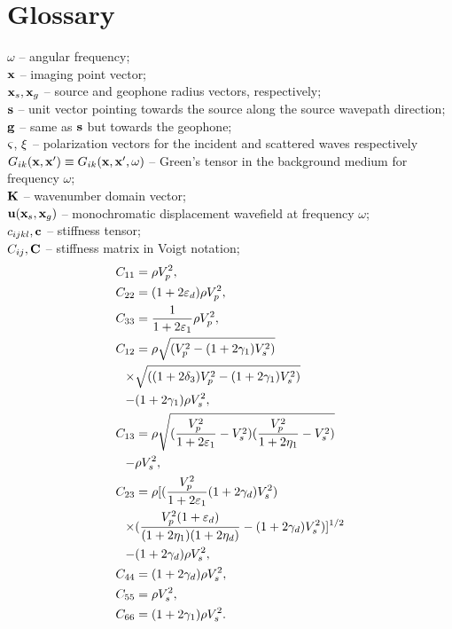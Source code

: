 \section*{Glossary}

$\omega$ -- angular frequency;
\\
$\xv$ -- imaging point vector;
\\
$\xv_s, \xv_g$ -- source and geophone radius vectors, respectively;
\\
$\sv$ -- unit vector pointing towards the source along the source wavepath direction;
\\
$\gv$ -- same as $\sv$ but towards the geophone;
\\
$\sp$, $\gp$ -- polarization vectors for the incident and scattered waves respectively
\\
$G_{ik}(\xv,\xv') \equiv G_{ik}(\xv,\xv',\omega)$ -- Green's tensor in the background medium for frequency $\omega$;
\\
$\Kv$ -- wavenumber domain vector;
\\
$\uv(\xv_s,\xv_g)$ -- monochromatic displacement wavefield at frequency $\omega$;
\\
$c_{ijkl}, \cv$ -- stiffness tensor;
\\
$C_{ij}, \Cv$ -- stiffness matrix in Voigt notation; 
\\
\begin{align} \label{eq:jw}
C_{11} &=\rho V^2_{p},
\\
C_{22} &=(1+2\eps_d)\rho V^2_{p},
\\
C_{33} &= \frac{1}{1+2\eps_1} \rho V^2_{p},
\\
C_{12} &= \rho \sqrt{( V^2_{p}-(1+2\gamma_1) V^2_{s})}\\
\times&\sqrt{((1+2\delta_3)V^2_{p}-(1+2\gamma_1) V^2_{s})}\\
- & (1+2\gamma_1 )\rho V^2_{s},
\\
C_{13} &= \rho \sqrt{(\frac{V^2_{p}}{1+2\eps_1}-V^2_{s})
	(\frac{V^2_{p}}{1+2\eta_1}-V^2_{s})}
\\
-&\rho V^2_{s},
\\
C_{23} &= \rho [(\frac{V^2_{p}}{1+2\eps_1}(1+2\gamma_d)\v_s^2)
\\
\times & (\frac{V^2_{p}(1+\eps_d)}{(1+2\eta_1)(1+2\eta_d)}-(1+2\gamma_d)V^2_{s})]^{1/2} 
\\
-&(1+2\gamma_d)\rho V^2_{s},
\\
C_{44} &=(1+2\gamma_d)\rho V^2_{s},
\\
C_{55} &=\rho V^2_{s},
\\
C_{66} &=(1+2\gamma_1)\rho V^2_{s}.
\end{align}
